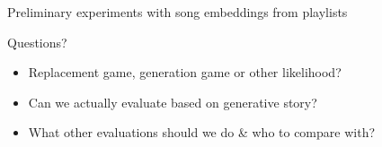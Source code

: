\documentclass{beamer}
\begin{document}
\begin{frame}{Preliminary experiments with song embeddings from playlists}
\end{frame}

\begin{frame}{Questions?}
  \begin{itemize}
    \item Replacement game, generation game or other likelihood?
    \item Can we actually evaluate based on generative story?
    \item What other evaluations should we do \& who to compare with?
  \end{itemize}
\end{frame}
\end{document}
